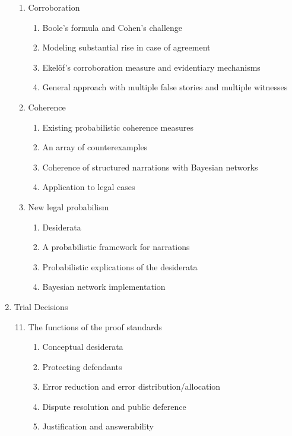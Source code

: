 \documentclass[10pt,dvipsnames,enabledeprecatedfontcommands]{scrartcl}
\begin{document}
\begin{enumerate}
\begin{enumerate}
 
  \item Corroboration
  \begin{enumerate}
  \item Boole's formula and Cohen's challenge
  \item  Modeling substantial rise in case of agreement
  \item Ekel\"of's corroboration measure and evidentiary mechanisms
  \item General approach with multiple false stories and multiple witnesses
  \end{enumerate}


  \item Coherence
  \begin{enumerate}
  \item  Existing probabilistic coherence measures
  \item  An array of counterexamples
  \item Coherence of structured narrations with Bayesian networks
  \item  Application to legal cases
  \end{enumerate}

  \item  New legal probabilism
    \begin{enumerate}
    \item  Desiderata
    \item  A probabilistic framework for narrations
    \item  Probabilistic explications of the desiderata
    \item  Bayesian network implementation
    \end{enumerate}


\end{enumerate}
\item  Trial Decisions
\begin{enumerate}



\setcounter{enumii}{10}
  \item  The functions of the proof standards
  \begin{enumerate}
  \item  Conceptual desiderata
  \item  Protecting defendants
  \item  Error reduction and error distribution/allocation
  \item  Dispute resolution and public deference
  \item  Justification and answerability
  \end{enumerate}




\end{enumerate}
\end{enumerate}
\end{document}
